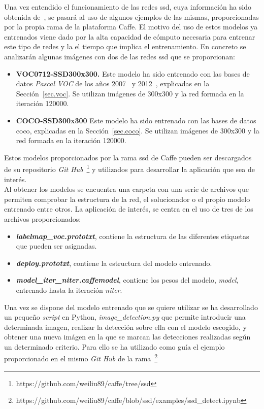 Una vez entendido el funcionamiento de las redes \acrshort{ssd}, cuya información ha sido obtenida de~\cite{2015arXiv151202325L}, se pasará al uso de algunos ejemplos de las mismas, proporcionadas por la propia rama de la plataforma Caffe. El motivo del uso de estos modelos ya entrenados viene dado por la alta capacidad de cómputo necesaria para entrenar este tipo de redes y la el tiempo que implica el entrenamiento. En concreto se analizarán algunas imágenes con dos de las redes \acrshort{ssd} que se proporcionan:
\begin{itemize}
	\item \textbf{VOC0712-SSD300x300.} Este modelo ha sido entrenado con las bases de datos \textit{Pascal VOC} de los años 2007~\cite{pascal-voc-2007} y 2012~\cite{pascal-voc-2012}, explicadas en la Sección~\ref{sec.voc}. Se utilizan imágenes de 300x300 y la red formada en la iteración 120000.
	\item \textbf{COCO-SSD300x300} Este modelo ha sido entrenado con las bases de datos \acrshort{coco}, explicadas en la Sección~\ref{sec.coco}. Se utilizan imágenes de 300x300 y la red formada en la iteración 120000.
\end{itemize}

Estos modelos proporcionados por la rama \acrshort{ssd} de Caffe pueden ser descargados de su repositorio \textit{Git Hub}~\footnote{https://github.com/weiliu89/caffe/tree/ssd} y utilizados para desarrollar la aplicación que sea de interés.\\

Al obtener los modelos se encuentra una carpeta con una serie de archivos que permiten comprobar la estructura de la red, el solucionador o el propio modelo entrenado entre otros. La aplicación de interés, se centra en el uso de tres de los archivos proporcionados:
\begin{itemize}
	\item \textbf{\textit{labelmap\_voc.prototxt}}, contiene la estructura de las diferentes etiquetas que pueden ser asignadas.
	\item \textbf{\textit{deploy.prototxt}}, contiene la estructura del modelo entrenado.
	\item \textbf{\textit{model\_iter\_niter.caffemodel}}, contiene los pesos del modelo, \textit{model}, entrenado hasta la iteración \textit{niter}.
\end{itemize}

Una vez se dispone del modelo entrenado que se quiere utilizar se ha desarrollado un pequeño \textit{script} en Python, \textit{image\_detection.py} que permite introducir una determinada imagen, realizar la detección sobre ella con el modelo escogido, y obtener una nueva imágen en la que se marcan las detecciones realizadas según un determinado criterio. Para ello se ha utilizado como guía el ejemplo proporcionado en el mismo \textit{Git Hub} de la rama~\footnote{https://github.com/weiliu89/caffe/blob/ssd/examples/ssd\_detect.ipynb}\\


